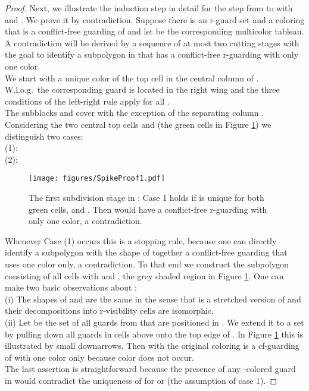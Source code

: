 \documentclass[a4paper,USenglish,numberwithinsect]{lipics}
\theoremstyle{plain}
\begin{document}
\begin{proof}
Next, we illustrate the induction step in detail for the step from
  to  with  and . We prove it by contradiction.
Suppose there  is an r-guard set  and a
coloring  that is a conflict-free guarding of 
and let  be the corresponding  multicolor tableau.
A contradiction will be derived by  a sequence of at most two
cutting stages with the goal to identify a subpolygon  in  that has a
conflict-free r-guarding with only one  color.\\
We start with a unique color  of the top cell  in the central column
 of . W.l.o.g.~the corresponding guard  is located in the right wing
 and the three conditions of the left-right rule apply for all . \\ 
The  subblocks  and   cover  with the exception
of the separating column .  Considering the two central top cells  and 
(the green cells in  Figure \ref{r-vis-indStep1})
 we distinguish  two cases:\\
  (1): \\
  (2): \\
\begin{figure}
\centering
    \texttt{[image: figures/SpikeProof1.pdf]}
\caption{The first subdivision stage in : Case 1 holds if   is
unique for both green cells,  and .
Then  would have a conflict-free r-guarding with only one color, a
contradiction.}
\label{r-vis-indStep1}
\end{figure}
Whenever Case (1) occurs  this is a stopping
rule, because  one can directly identify a subpolygon  with the
shape of  together a conflict-free guarding that uses  one color only, a contradiction.
To that end we construct the subpolygon  consisting of all cells
 with  and , the  grey shaded region 
in Figure \ref{r-vis-indStep1}.
One can make two basic observations about :
\\
(i) The shapes of  and   are the same in the sense that 
 is a stretched version of  and their
decompositions  into r-visibility cells are isomorphic. 
\\
(ii) Let  be the set of all guards from  that  are positioned in
. We extend it to a
set  by pulling down
all guards in cells above  onto the top edge of . In Figure \ref{r-vis-indStep1}
 this is illustrated by small downarrows. Then  
with the original coloring  is a cf-guarding of
 with one color only because color  does not occur. \\The last
assertion is
straightforward because the presence of any -colored guard in
 would contradict
the uniqueness of  for    or  (the assumption of case 1).

\end{proof}
\end{document}
